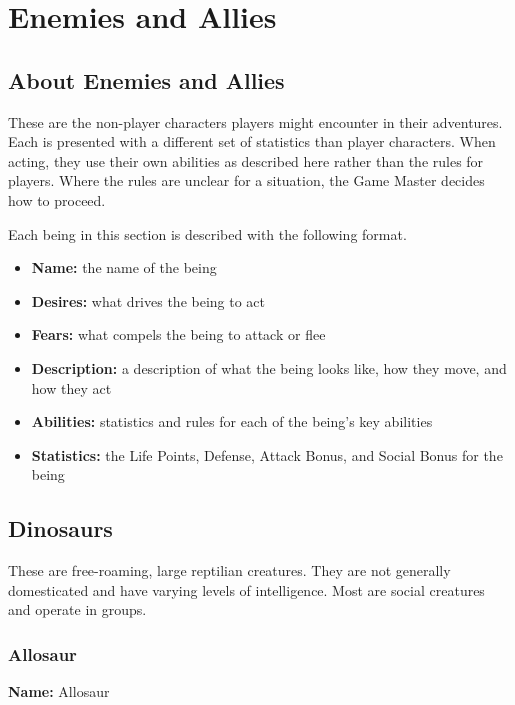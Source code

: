 \chapter{Enemies and Allies}

\begin{multicols}{2}

\section{About Enemies and Allies}

These are the non-player characters players might encounter in
their adventures. Each is presented with a different set of
statistics than player characters. When acting, they use their
own abilities as described here rather than the rules for players.
Where the rules are unclear for a situation, the Game Master decides
how to proceed.

Each being in this section is described with the following format.

\begin{itemize}
  \item \textbf{Name:} the name of the being
  \item \textbf{Desires:} what drives the being to act
  \item \textbf{Fears:} what compels the being to attack or flee
  \item \textbf{Description:} a description of what the being looks like, how they move, and how they act
  \item \textbf{Abilities:} statistics and rules for each of the being's key abilities
  \item \textbf{Statistics:} the Life Points, Defense, Attack Bonus, and Social Bonus for the being
\end{itemize}

\section{Dinosaurs}

These are free-roaming, large reptilian creatures. They
are not generally domesticated and have varying levels
of intelligence. Most are social creatures and operate in
groups.

\subsection{Allosaur}

\textbf{Name:} Allosaur


\end{multicols}

